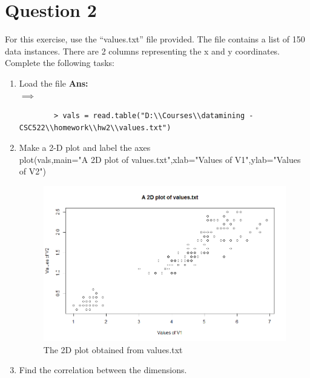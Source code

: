 \documentclass[fontsize=10pt]{scrartcl}
\begin{document}
	\section{Question 2}
	For this exercise, use the “values.txt” file provided. The file contains a list of 150 data instances. There are 2 columns representing the x and y coordinates. Complete the following tasks: \\
	\begin{enumerate}
		\item
		Load the file
		\textbf{Ans:} \\
		$\implies$
		\begin{verbatim}
		> vals = read.table("D:\\Courses\\datamining - CSC522\\homework\\hw2\\values.txt")
		\end{verbatim}
		

		\item
		Make a 2-D plot and label the axes \\
		plot(vals,main="A 2D plot of values.txt",xlab="Values of V1",ylab="Values of V2") \\
		\begin{figure}[H]
			\begin{center}
				\includegraphics[scale=.5]{resources/q2_plot.png}
				\caption{The 2D plot obtained from values.txt}
			\end{center}
		\end{figure}

		\item
		Find the correlation between the dimensions. \\
		

\end{enumerate}
\end{document}
